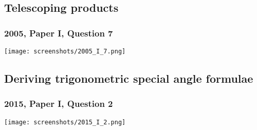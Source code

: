 \documentclass[a4paper,12pt]{article}
\begin{document}
\subsection{Telescoping products}

\subsubsection{2005, Paper I, Question 7}
\begin{center}
 \texttt{[image: screenshots/2005\_I\_7.png]}
\end{center}

\subsection{Deriving trigonometric special angle formulae}

\subsubsection{2015, Paper I, Question 2}
\begin{center}
 \texttt{[image: screenshots/2015\_I\_2.png]}
\end{center}
\end{document}
